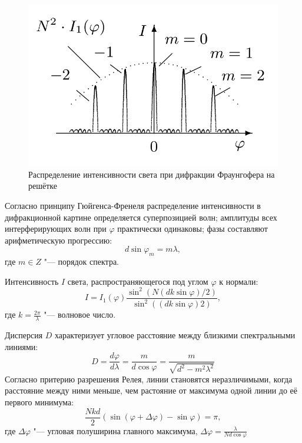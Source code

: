 \documentclass[10pt, a4paper]{article}
\begin{document}
 \begin{figure}[H]
	\includegraphics[width = 1.0\linewidth]{1.png}
	\caption*{Распределение интенсивности света при дифракции Фраунгофера на решётке}
\end{figure}

Согласно принципу Гюйгенса-Френеля распределение интенсивности в дифракционной картине определяется суперпозицией волн; амплитуды всех интерферирующих волн при $\varphi$ практически одинаковы; фазы составляют арифметическую прогрессию:
\[
	d \sin \varphi_m = m \lambda,
 \]
 где $m \in Z$ "--- порядок спектра.
 
 Интенсивность $I$ света, распространяющегося под углом $\varphi$ к нормали:
 \[
 I = I_1(\varphi)\frac{\sin^2 (N(dk \sin \varphi) / 2)}{\sin^2 ((dk \sin \varphi) 2)},
 \]
 где $k = \frac{2 \pi}{\lambda}$ "--- волновое число.
 
 Дисперсия $D$ характеризует угловое расстояние между близкими спектральными линиями:
 \[
 D = \frac{d \varphi}{d \lambda} = \frac{m}{d \cos \varphi} = \frac{m}{\sqrt{d^2 - m^2 \lambda^2}}
 \]
 Согласно притерию разрешения Релея, линии становятся неразличимыми, когда расстояние между ними меньше, чем растояние от максимума одной линии до её первого минимума:
 \[
 	\frac{Nkd}{2}(\sin (\varphi + \Delta \varphi) - \sin \varphi) = \pi,
 \]
 где $\Delta \varphi$ "--- угловая полуширина главного максимума, $\Delta \varphi = \frac{\lambda}{Nd \cos \varphi}$
 
\end{document}

